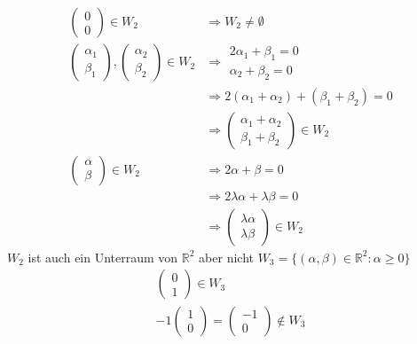 \documentclass[11pt]{report}
\newcommand*\Zb[1] {\mathbb{#1}}
\begin{document}
\begin{align}
 \begin{pmatrix} 0 \\ 0 \end{pmatrix} 
 \in W_2 &\Rightarrow W_2 \neq \emptyset \\
 \begin{pmatrix} \alpha_1 \\ \beta_1 \end{pmatrix},  
 \begin{pmatrix} \alpha_2 \\ \beta_2 \end{pmatrix} \in W_2 
 &\Rightarrow  \begin{matrix} 2 \alpha_1 + \beta_1 = 0 \\ \alpha_2 + \beta_2 = 0 \end{matrix} \\
 &\Rightarrow 2 (\alpha_1 + \alpha_2) + (\beta_1+ \beta_2) = 0\\
 &\Rightarrow \begin{pmatrix} \alpha_1 + \alpha_2 \\ \beta_1 + \beta_2 \end{pmatrix} \in W_2 \\
 \begin{pmatrix} \alpha \\ \beta \end{pmatrix} \in W_2 &\Rightarrow 2\alpha + \beta = 0 \\
 &\Rightarrow 2\lambda\alpha + \lambda\beta = 0 \\
 &\Rightarrow\begin{pmatrix} \lambda\alpha \\ \lambda\beta \end{pmatrix} \in W_2
\end{align}
$W_2$ ist auch ein Unterraum von $\Zb{R}^2$ aber nicht $W_3 = \{(\alpha, \beta) \in \Zb{R}^2: \alpha \geq 0\}$
\begin{align}
 \begin{pmatrix} 0 \\ 1 \end{pmatrix} \in W_3 \\
 -1 \begin{pmatrix} 1 \\ 0 \end{pmatrix} = \begin{pmatrix} -1 \\ 0 \end{pmatrix} \notin W_3
\end{align}
\end{document}
